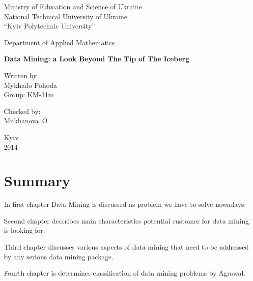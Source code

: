 \documentclass[a4paper,12pt,notitlepage,pdftex]{scrreprt}
\begin{document}
\begin{titlepage}
    \begin{center}
        Ministry of Education and Science of Ukraine\\
        National Technical University of Ukraine\\
        ``Kyiv Polytechnic University''\\
        \vspace*{2em}

        Department of Applied Mathematics\\

        \vfill
        \vfill
        \vfill

        \textbf{Data Mining: a Look Beyond The Tip of The Iceberg}\\
    \end{center}

    \vfill
    \hfill\begin{minipage}{0.22\textwidth}
        Written by\\
        Mykhailo Pohoda\\
        Group: KM-31m

        \vspace*{1em}
        Checked by:\\
        Mukhanova~O\\
        \underline{\hspace*{\textwidth}}
    \end{minipage}

    \vfill
    \begin{center}
        Kyiv\\
        2014
    \end{center}
\end{titlepage}

\tableofcontents
\chapter{Summary}
    In first chapter Data Mining is discussed as problem we have to solve nowadays.

    Second chapter describes main characteristics potential customer for data mining is looking for.

    Third chapter discusses various aspects of data mining that need to be addressed by any serious data mining
    package.

    Fourth chapter is determines classification of data mining problems by Agrawal.
\end{document}
